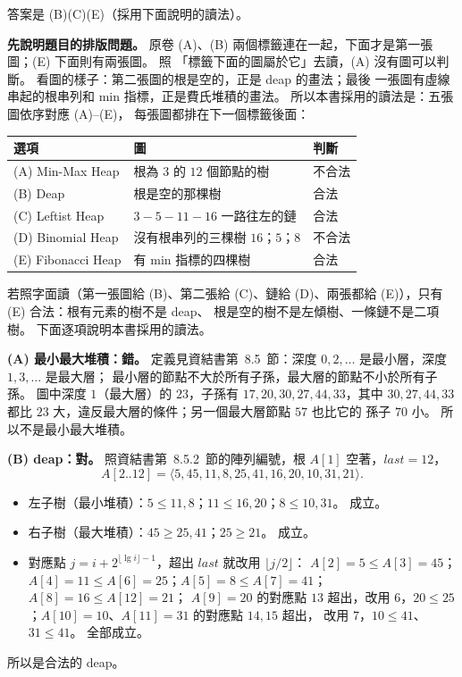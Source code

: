 \begin{pastsoln}
答案是 (B)(C)(E)（採用下面說明的讀法）。

\textbf{先說明題目的排版問題。} 原卷 (A)、(B) 兩個標籤連在一起，下面才是第一張圖；(E) 下面則有兩張圖。 照
「標籤下面的圖屬於它」去讀，(A) 沒有圖可以判斷。 看圖的樣子：第二張圖的根是空的，正是 deap 的畫法；最後
一張圖有虛線串起的根串列和 min 指標，正是費氏堆積的畫法。 所以本書採用的讀法是：五張圖依序對應 (A)--(E)，
每張圖都排在下一個標籤後面：
\begin{center}
\small
\begin{tabular}{lll}
\toprule
選項 & 圖 & 判斷 \\
\midrule
(A) Min-Max Heap & 根為 $3$ 的 $12$ 個節點的樹 & 不合法 \\
(B) Deap & 根是空的那棵樹 & 合法 \\
(C) Leftist Heap & $3 - 5 - 11 - 16$ 一路往左的鏈 & 合法 \\
(D) Binomial Heap & 沒有根串列的三棵樹 $16$；$5$；$8$ & 不合法 \\
(E) Fibonacci Heap & 有 min 指標的四棵樹 & 合法 \\
\bottomrule
\end{tabular}
\end{center}
若照字面讀（第一張圖給 (B)、第二張給 (C)、鏈給 (D)、兩張都給 (E)），只有 (E) 合法：根有元素的樹不是 deap、
根是空的樹不是左傾樹、一條鏈不是二項樹。 下面逐項說明本書採用的讀法。

\textbf{(A) 最小最大堆積：錯。} 定義見資結書第~8.5~節：深度 $0, 2, \ldots$ 是最小層，深度 $1, 3, \ldots$ 是最大層；
最小層的節點不大於所有子孫，最大層的節點不小於所有子孫。 圖中深度 $1$（最大層）的 $23$，子孫有
$17, 20, 30, 27, 44, 33$，其中 $30, 27, 44, 33$ 都比 $23$ 大，違反最大層的條件；另一個最大層節點 $57$ 也比它的
孫子 $70$ 小。 所以不是最小最大堆積。

\textbf{(B) deap：對。} 照資結書第~8.5.2~節的陣列編號，根 $A[1]$ 空著，$\mathit{last} = 12$，
\[
A[2..12] = \langle 5, 45, 11, 8, 25, 41, 16, 20, 10, 31, 21\rangle .
\]
\begin{itemize}
\item 左子樹（最小堆積）：$5 \le 11, 8$；$11 \le 16, 20$；$8 \le 10, 31$。 成立。
\item 右子樹（最大堆積）：$45 \ge 25, 41$；$25 \ge 21$。 成立。
\item 對應點 $j = i + 2^{\lfloor \lg i \rfloor - 1}$，超出 $\mathit{last}$ 就改用 $\lfloor j/2 \rfloor$：
$A[2] = 5 \le A[3] = 45$；$A[4] = 11 \le A[6] = 25$；$A[5] = 8 \le A[7] = 41$；$A[8] = 16 \le A[12] = 21$；
$A[9] = 20$ 的對應點 $13$ 超出，改用 $6$，$20 \le 25$；$A[10] = 10$、$A[11] = 31$ 的對應點 $14, 15$ 超出，
改用 $7$，$10 \le 41$、$31 \le 41$。 全部成立。
\end{itemize}
所以是合法的 deap。


\end{pastsoln}
